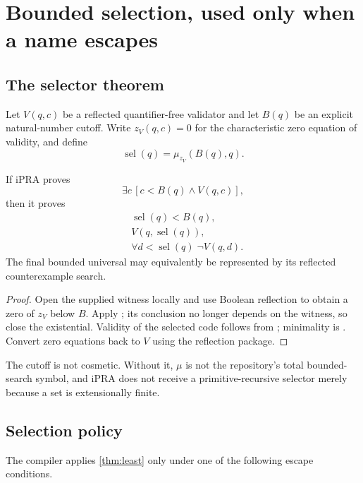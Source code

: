 \section{Bounded selection, used only when a name escapes}
\label{sec:selection}

\subsection{The selector theorem}

Let \(V(q,c)\) be a reflected quantifier-free validator and let \(B(q)\) be an
explicit natural-number cutoff.  Write \(z_V(q,c)=0\) for the characteristic
zero equation of validity, and define
\[
       \operatorname{sel}(q)=\mu_{z_V}(B(q),q).
\]

\begin{theorem}
\label{thm:least}
If iPRA proves
\[
  \exists c\,[c<B(q)\wedge V(q,c)],
\]
then it proves
\[
\begin{aligned}
 &\operatorname{sel}(q)<B(q),\\
 &V(q,\operatorname{sel}(q)),\\
 &\forall d<\operatorname{sel}(q)\;\neg V(q,d).
\end{aligned}
\]
The final bounded universal may equivalently be represented by its reflected
counterexample search.
\end{theorem}

\begin{proof}
Open the supplied witness locally and use Boolean reflection to obtain a zero
of \(z_V\) below \(B\).  Apply ; its conclusion no
longer depends on the witness, so close the existential.  Validity of the
selected code follows from ; minimality is
.  Convert zero equations back to \(V\) using the
reflection package.
\end{proof}

The cutoff is not cosmetic.  Without it, \(\mu\) is not the repository's total
bounded-search symbol, and iPRA does not receive a primitive-recursive
selector merely because a set is extensionally finite.

\subsection{Selection policy}

The compiler applies \cref{thm:least} only under one of the following escape
conditions.

